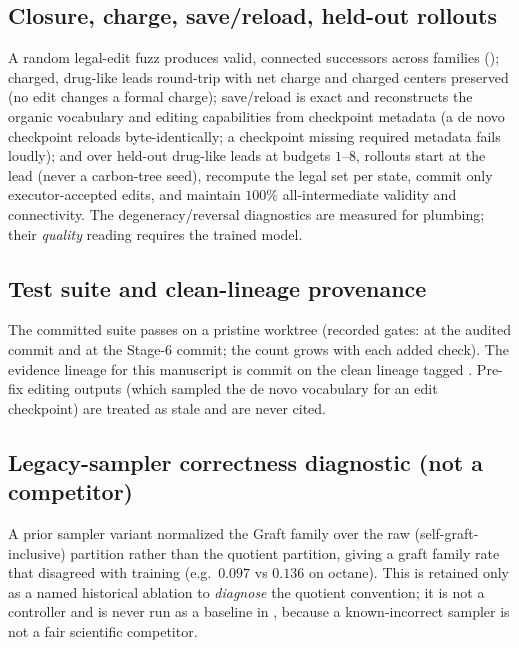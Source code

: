 \subsection{Closure, charge, save/reload, held-out rollouts}
A random legal-edit fuzz produces valid, connected successors across families ();
charged, drug-like leads round-trip with net charge and charged centers preserved (no edit changes a
formal charge); save/reload is exact and reconstructs the organic vocabulary and editing capabilities from
checkpoint metadata (a de novo checkpoint reloads byte-identically; a checkpoint missing required metadata
fails loudly); and over held-out drug-like leads at budgets $1$--$8$, rollouts start at the lead (never a
carbon-tree seed), recompute the legal set per state, commit only executor-accepted edits, and maintain
$100\%$ all-intermediate validity and connectivity. The degeneracy/reversal diagnostics are measured for
plumbing; their \emph{quality} reading requires the trained model.

\subsection{Test suite and clean-lineage provenance}
The committed suite passes on a pristine worktree (recorded gates:  at the
audited commit and  at the Stage-6 commit; the count grows with each added
check). The evidence lineage for this manuscript is commit  on the clean
lineage tagged . Pre-fix editing outputs (which sampled the de novo vocabulary
for an edit checkpoint) are treated as stale and are never cited.

\subsection{Legacy-sampler correctness diagnostic (not a competitor)}
A prior sampler variant normalized the Graft family over the raw (self-graft-inclusive) partition rather
than the quotient partition, giving a graft family rate that disagreed with training (e.g.\ $0.097$ vs
$0.136$ on octane). This is retained only as a named historical ablation to \emph{diagnose} the quotient
convention; it is not a controller and is never run as a baseline in , because a
known-incorrect sampler is not a fair scientific competitor.

